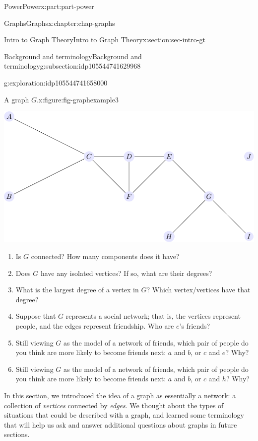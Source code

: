 \documentclass[oneside,10pt,]{book}
\numberwithin{equation}{section}
\begin{document}
\begin{partptx}{Power}{}{Power}{}{}{x:part:part-power}
\begin{chapterptx}{Graphs}{}{Graphs}{}{}{x:chapter:chap-graphs}
\begin{sectionptx}{Intro to Graph Theory}{}{Intro to Graph Theory}{}{}{x:section:sec-intro-gt}
\begin{subsectionptx}{Background and terminology}{}{Background and terminology}{}{}{g:subsection:idp105544741629968}
\begin{exploration}{}{g:exploration:idp105544741658000}
\begin{figureptx}{A graph \(G\).}{x:figure:fig-graphexample3}{}
\begin{image}{0.25}{0.5}{0.25}
\includegraphics[width=\linewidth]{images/graph03.pdf}
\end{image}%
\tcblower
\end{figureptx}%
%
\begin{enumerate}
\item{}Is \(G\) connected? How many components does it have?%
\item{}Does \(G\) have any isolated vertices? If so, what are their degrees?%
\item{}What is the largest degree of a vertex in \(G\)? Which vertex\slash{}vertices have that degree?%
\item{}Suppose that \(G\) represents a social network; that is, the vertices represent people, and the edges represent friendship. Who are \(e\)'s friends?%
\item{}Still viewing \(G\) as the model of a network of friends, which pair of people do you think are more likely to become friends next: \(a\) and \(b\), or \(c\) and \(e\)? Why?%
\item{}Still viewing \(G\) as the model of a network of friends, which pair of people do you think are more likely to become friends next: \(a\) and \(b\), or \(c\) and \(h\)? Why?%
\end{enumerate}
\end{exploration}%
\end{subsectionptx}
\begin{conclusion}{}%
In this section, we introduced the idea of a graph as essentially a network: a collection of \emph{vertices} connected by \emph{edges}. We thought about the types of situations that could be described with a graph, and learned some terminology that will help us ask and answer additional questions about graphs in future sections.%
\end{conclusion}%
%
%
\typeout{************************************************}

\end{sectionptx}
\end{chapterptx}
\end{partptx}
\end{document}
